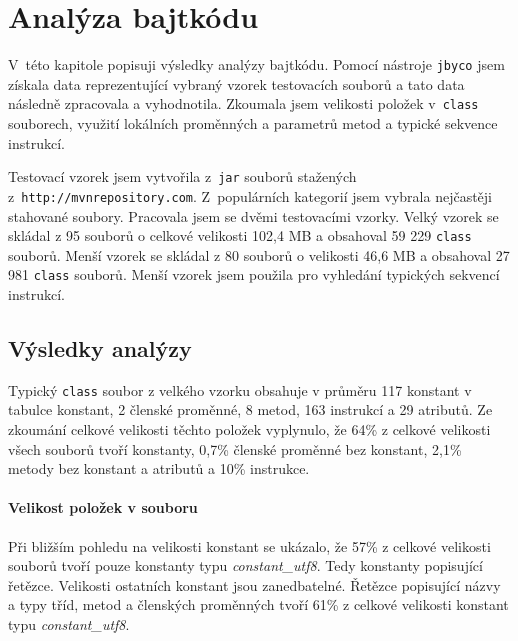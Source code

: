 \chapter{Analýza bajtkódu}\label{Analysis}


V~této kapitole popisuji výsledky analýzy bajtkódu. Pomocí nástroje \texttt{jbyco} jsem získala data reprezentující vybraný vzorek testovacích souborů a tato data následně zpracovala a vyhodnotila. Zkoumala jsem velikosti položek v~\texttt{class} souborech, využití lokálních proměnných a parametrů metod a typické sekvence instrukcí.

Testovací vzorek jsem vytvořila z~\texttt{jar} souborů stažených z~\texttt{http://mvnrepository.com}. Z~populárních kategorií jsem vybrala nejčastěji stahované soubory. Pracovala jsem se dvěmi testovacími vzorky. Velký vzorek se skládal z 95 souborů o celkové velikosti 102,4 MB a obsahoval 59 229 \texttt{class} souborů. Menší vzorek se skládal z 80 souborů o velikosti 46,6 MB a obsahoval 27 981
\texttt{class} souborů. Menší vzorek jsem použila pro vyhledání typických sekvencí instrukcí.

\section{Výsledky analýzy}\label{AnalysisResults}

Typický \texttt{class} soubor z velkého vzorku obsahuje v průměru 117 konstant v tabulce konstant, 2 členské proměnné, 8 metod, 163 instrukcí a 29 atributů. Ze zkoumání celkové velikosti těchto položek vyplynulo, že 64\% z celkové velikosti všech souborů tvoří konstanty, 0,7\% členské proměnné bez konstant, 2,1\% metody bez konstant a atributů a 10\% instrukce.

\subsubsection{Velikost položek v souboru}

Při bližším pohledu na velikosti konstant se ukázalo, že 57\% z celkové velikosti souborů tvoří pouze konstanty typu \textit{constant\_utf8}. Tedy konstanty popisující řetězce. Velikosti ostatních konstant jsou zanedbatelné. Řetězce popisující názvy a typy tříd, metod a členských proměnných tvoří 61\% z celkové velikosti konstant typu \textit{constant\_utf8}.

